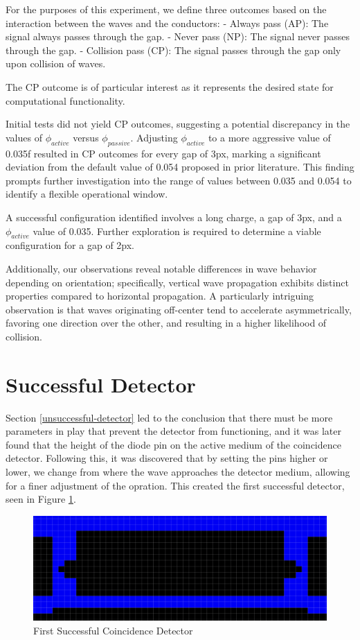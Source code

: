 For the purposes of this experiment, we define three outcomes based on the interaction between the waves and the conductors:
- Always pass (AP): The signal always passes through the gap.
- Never pass (NP): The signal never passes through the gap.
- Collision pass (CP): The signal passes through the gap only upon collision of waves.

The CP outcome is of particular interest as it represents the desired state for computational functionality.

Initial tests did not yield CP outcomes, suggesting a potential discrepancy in the values of $\phi_{active}$ versus $\phi_{passive}$. Adjusting $\phi_{active}$ to a more aggressive value of 0.035f resulted in CP outcomes for every gap of 3px, marking a significant deviation from the default value of 0.054 proposed in prior literature. This finding prompts further investigation into the range of values between 0.035 and 0.054 to identify a flexible operational window. 

A successful configuration identified involves a long charge, a gap of 3px, and a $\phi_{active}$ value of 0.035. Further exploration is required to determine a viable configuration for a gap of 2px.

Additionally, our observations reveal notable differences in wave behavior depending on orientation; specifically, vertical wave propagation exhibits distinct properties compared to horizontal propagation. A particularly intriguing observation is that waves originating off-center tend to accelerate asymmetrically, favoring one direction over the other, and resulting in a higher likelihood of collision.

\section{Successful Detector}

Section \ref{unsuccessful-detector} led to the conclusion that there must be more parameters in play that prevent the detector from functioning, and it was later found that the height of the diode pin on the active medium of the coincidence detector. 
Following this, it was discovered that by setting the pins higher or lower, we change from where the wave approaches the detector medium, allowing for a finer adjustment of the opration. This created the first successful detector, seen in Figure \ref{fig:first-successful-detector}.

\begin{figure}
    \centering
    \includegraphics[width=0.75\linewidth]{image9.png}
    \caption{First Successful Coincidence Detector}
    \label{fig:first-successful-detector}
\end{figure}


